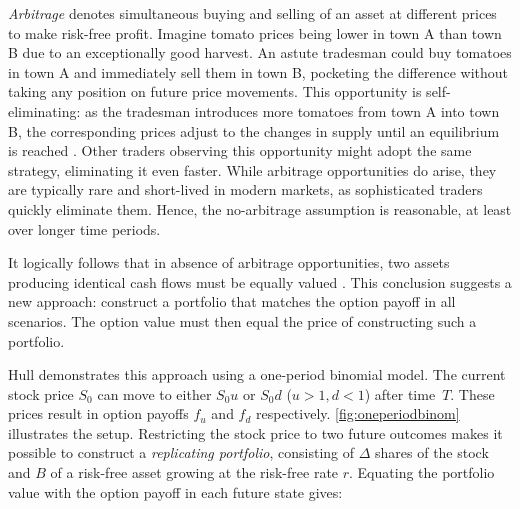 \documentclass[english,12pt,a4paper,pdftex,sci,utf8]{aaltothesis}
\begin{document}
\emph{Arbitrage} denotes simultaneous buying and selling of an asset at different prices to make risk-free profit. Imagine tomato prices being lower in town A than town B due to an exceptionally good harvest. An astute tradesman could buy tomatoes in town A and immediately sell them in town B, pocketing the difference without taking any position on future price movements. This opportunity is self-eliminating: as the tradesman introduces more tomatoes from town A into town B, the corresponding prices adjust to the changes in supply until an equilibrium is reached \cite{hull2018, wilmott2013paul}. Other traders observing this opportunity might adopt the same strategy, eliminating it even faster. While arbitrage opportunities do arise, they are typically rare and short-lived in modern markets, as sophisticated traders quickly eliminate them. Hence, the no-arbitrage assumption is reasonable, at least over longer time periods.

It logically follows that in absence of arbitrage opportunities, two assets producing identical cash flows must be equally valued \cite{hull2018, wilmott2013paul}. This conclusion suggests a new approach: construct a portfolio that matches the option payoff in all scenarios. The option value must then equal the price of constructing such a portfolio.

Hull \cite{hull2018} demonstrates this approach using a one-period binomial model. The current stock price $S_0$ can move to either $S_0u$ or $S_0d$ ($u>1,d<1$) after time~$T$. These prices result in option payoffs $f_u$ and $f_d$ respectively. \cref{fig:oneperiodbinom} illustrates the setup. Restricting the stock price to two future outcomes makes it possible to construct a \emph{replicating portfolio}, consisting of $\Delta$ shares of the stock and $B$ of a risk-free asset growing at the risk-free rate $r$. Equating the portfolio value with the option payoff in each future state gives:
\end{document}
